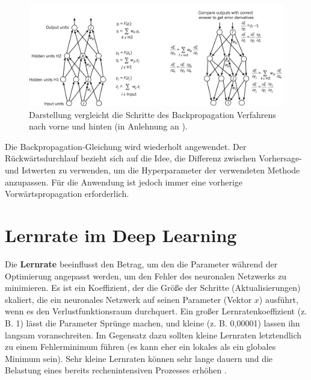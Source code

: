         \begin{figure}[H]
            \centering
            \includegraphics[width=13cm]{kapitel2/backprop.png}
            \caption[Die Vorwärts- und Rückwärtsschritte im Backpropagation]{Darstellung vergleicht die Schritte des Backpropagation Verfahrens nach vorne und hinten (in Anlehnung an \cite*{Lecun2015}).}
            \label{BackProp}
        \end{figure}

        Die Backpropagation-Gleichung wird wiederholt angewendet. Der Rückwärtsdurchlauf bezieht sich auf die Idee, die Differenz zwischen Vorhersage- und Istwerten zu verwenden, um die Hyperparameter der verwendeten Methode anzupassen. Für die Anwendung ist jedoch immer eine vorherige Vorwärtspropagation erforderlich.


        \section{Lernrate im Deep Learning}\label{learnsection}
        Die \textbf{Lernrate} beeinflusst den Betrag, um den die Parameter während der Optimierung angepasst werden, um den Fehler des neuronalen Netzwerks zu minimieren. Es ist ein Koeffizient, der die Größe der Schritte (Aktualisierungen) skaliert, die ein neuronales Netzwerk auf seinen Parameter (Vektor $x$) ausführt, wenn es den Verlustfunktionsraum durchquert. Ein großer Lernratenkoeffizient (z. B. 1) lässt die Parameter Sprünge machen, und kleine (z. B. 0,00001) lassen ihn langsam voranschreiten. Im Gegensatz dazu sollten kleine Lernraten letztendlich zu einem Fehlerminimum führen (es kann eher ein lokales als ein globales Minimum sein). Sehr kleine Lernraten können sehr lange dauern und die Belastung eines bereits rechenintensiven Prozesses erhöhen  \cite*[77]{Patterson2019}.



